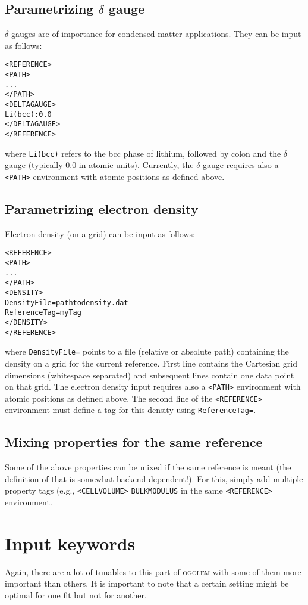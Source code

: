 \documentclass[a4paper,10pt]{scrbook}
\newcommand{\ogo}{\textsc{ogolem}}
\begin{document}
\subsection{Parametrizing $\delta$ gauge}
$\delta$ gauges are of importance for condensed matter applications. They can be input as follows:
\begin{verbatim}
<REFERENCE>
<PATH>
...
</PATH>
<DELTAGAUGE>
Li(bcc):0.0
</DELTAGAUGE>
</REFERENCE>
\end{verbatim}
where \texttt{Li(bcc)} refers to the bcc phase of lithium, followed by colon and the $\delta$ gauge (typically 0.0 in atomic units). Currently, the $\delta$ gauge requires also a \texttt{<PATH>} environment with atomic positions as defined above.

\subsection{Parametrizing electron density}
Electron density (on a grid) can be input as follows:
\begin{verbatim}
<REFERENCE>
<PATH>
...
</PATH>
<DENSITY>
DensityFile=pathtodensity.dat
ReferenceTag=myTag
</DENSITY>
</REFERENCE>
\end{verbatim}
where \texttt{DensityFile=} points to a file (relative or absolute path) containing the density on a grid for the current reference. First line contains the Cartesian grid dimensions (whitespace separated) and subsequent lines contain one data point on that grid. The electron density input requires also a \texttt{<PATH>} environment with atomic positions as defined above. The second line of the \texttt{<REFERENCE>} environment must define a tag for this density using \texttt{ReferenceTag=}.

\subsection{Mixing properties for the same reference}
Some of the above properties can be mixed if the same reference is meant (the definition of that is somewhat backend dependent!). For this, simply add multiple property tags (e.g., \texttt{<CELLVOLUME>} \texttt{BULKMODULUS} in the same \texttt{<REFERENCE>} environment.

\section{Input keywords}
Again, there are a lot of tunables to this part of \ogo{} with some of them more
important than others. It is important to note that a certain setting might be
optimal for one fit but not for another.
\end{document}
